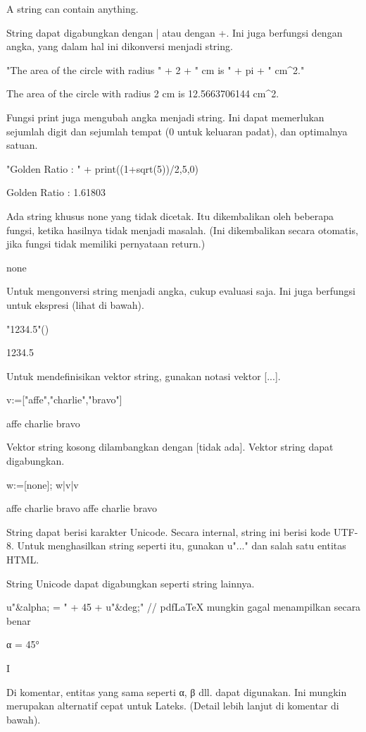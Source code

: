 \documentclass{article}
\begin{document}
    A string can contain anything.

String dapat digabungkan dengan | atau dengan +. Ini juga berfungsi
dengan angka, yang dalam hal ini dikonversi menjadi string.


\>"The area of the circle with radius " + 2 + " cm is " + pi + " cm^2."


    The area of the circle with radius 2 cm is 12.5663706144 cm^2.

Fungsi print juga mengubah angka menjadi string. Ini dapat memerlukan
sejumlah digit dan sejumlah tempat (0 untuk keluaran padat), dan
optimalnya satuan.


\>"Golden Ratio : " + print((1+sqrt(5))/2,5,0)


    Golden Ratio : 1.61803

Ada string khusus none yang tidak dicetak. Itu dikembalikan oleh
beberapa fungsi, ketika hasilnya tidak menjadi masalah. (Ini
dikembalikan secara otomatis, jika fungsi tidak memiliki pernyataan
return.)


\>none


Untuk mengonversi string menjadi angka, cukup evaluasi saja. Ini juga
berfungsi untuk ekspresi (lihat di bawah).


\>"1234.5"()


    1234.5

Untuk mendefinisikan vektor string, gunakan notasi vektor [...].


\>v:=["affe","charlie","bravo"]


    affe
    charlie
    bravo

Vektor string kosong dilambangkan dengan [tidak ada]. Vektor string
dapat digabungkan.


\>w:=[none]; w|v|v


    affe
    charlie
    bravo
    affe
    charlie
    bravo

String dapat berisi karakter Unicode. Secara internal, string ini
berisi kode UTF-8. Untuk menghasilkan string seperti itu, gunakan
u"..." dan salah satu entitas HTML.


String Unicode dapat digabungkan seperti string lainnya.


\>u"&alpha; = " + 45 + u"&deg;" // pdfLaTeX mungkin gagal menampilkan secara benar


    α = 45°

I


Di komentar, entitas yang sama seperti α, β dll. dapat
digunakan. Ini mungkin merupakan alternatif cepat untuk Lateks.
(Detail lebih lanjut di komentar di bawah).
\end{document}
